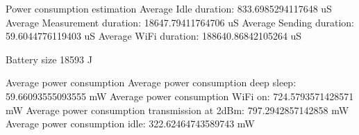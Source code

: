 Power consumption estimation
Average Idle duration: 833.6985294117648 uS
Average Measurement duration: 18647.79411764706 uS
Average Sending duration: 59.6044776119403 uS
Average WiFi duration: 188640.86842105264 uS

Battery size
18593 J

Average power consumption 
Average power consumption deep sleep:  59.66093555093555 mW
Average power consumption WiFi on:  724.5793571428571 mW
Average power consumption transmission at 2dBm:  797.2942857142858 mW
Average power consumption idle:  322.62464743589743 mW